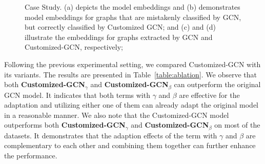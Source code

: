 \documentclass[11pt,dvipdfm]{article}
\begin{document}
\begin{figure}[ht]
    \qquad
    \caption{Case Study. (a) depicts the model embeddings and (b) demonstrates model embeddings for graphs that are mistakenly classified by GCN, but correctly classified by Customized GCN; and (c) and (d) illustrate the embeddings for graphs extracted by GCN and Customized-GCN, respectively;}%
    \label{fig:yiqi_case-study}
\end{figure}

Following the previous experimental setting, we compared Customized-GCN with its variants.
The results are presented in Table~\ref{table:ablation}. We observe that both \textbf{Customized-GCN$_{\gamma}$} and \textbf{Customized-GCN$_{\beta}$} can outperform the original GCN model. It indicates that both terms with $\gamma$ and $\beta$ are effective for the adaptation and utilizing either one of them can already adapt the original model in a reasonable manner. We also note that the Customized-GCN model outperforms both \textbf{Customized-GCN$_{\gamma}$} and \textbf{Customized-GCN$_{\beta}$} on most of the datasets. It demonstrates that the adaption effects of the term with $\gamma$ and $\beta$ are complementary to each other and combining them together can further enhance the performance. 
\end{document}
